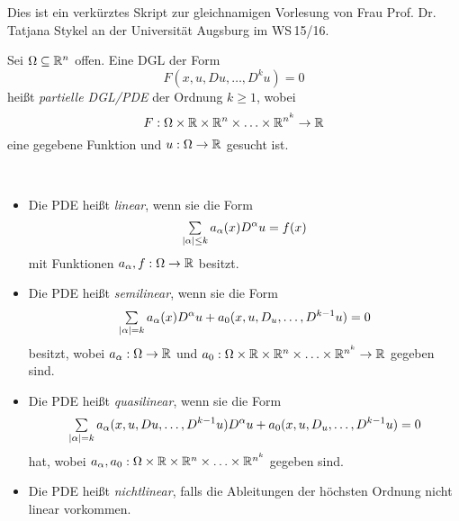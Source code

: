 \documentclass{cheat-sheet}
\begin{document}
\raggedcolumns %


Dies ist ein verkürztes Skript zur gleichnamigen Vorlesung von Frau Prof. Dr. Tatjana Stykel an der Universität Augsburg im WS\,15/16.





\begin{defn}
  Sei $\Omega \subseteq \mathbb{R}^n$ offen.
  Eine DGL der Form
  \[ F(x, u, Du, \ldots, D^k u) = 0 \]
  heißt \emph{partielle DGL/PDE} der Ordnung $k \geq 1$, wobei
  \[ F : \Omega \times \mathbb{R} \times \mathbb{R}^n \times \ldots \times \mathbb{R}^{n^k} \to \mathbb{R} \]
  eine gegebene Funktion und $u : \Omega \to \mathbb{R}$ gesucht ist.
\end{defn}

\begin{defn}\mbox{}\\
  \begin{itemize}
    \item Die PDE heißt \emph{linear}, wenn sie die Form
    \[ \sum_{\abs{\alpha} \leq k} a_\alpha(x) D^\alpha u = f(x) \]
    mit Funktionen $a_\alpha, f : \Omega \to \mathbb{R}$ besitzt.
    \item Die PDE heißt \emph{semilinear}, wenn sie die Form
    \[ \sum_{\abs{\alpha} = k} a_\alpha(x) D^\alpha u + a_0(x, u, D_u, \ldots, D^{k-1} u) = 0 \]
    besitzt, wobei $a_\alpha : \Omega \to \mathbb{R}$ und $a_0 : \Omega \times \mathbb{R} \times \mathbb{R}^n \times \ldots \times \mathbb{R}^{n^k} \to \mathbb{R}$ gegeben sind.
    \item Die PDE heißt \emph{quasilinear}, wenn sie die Form
    \[ \sum_{\abs{\alpha} = k} a_\alpha(x, u, Du, \ldots, D^{k-1} u) D^\alpha u + a_0(x, u, D_u, \ldots, D^{k-1} u) = 0 \]
    hat, wobei $a_\alpha, a_0 : \Omega \times \mathbb{R} \times \mathbb{R}^n \times \ldots \times \mathbb{R}^{n^k}$ gegeben sind.
    \item Die PDE heißt \emph{nichtlinear}, falls die Ableitungen der höchsten Ordnung nicht linear vorkommen.
  \end{itemize}
\end{defn}
\end{document}
